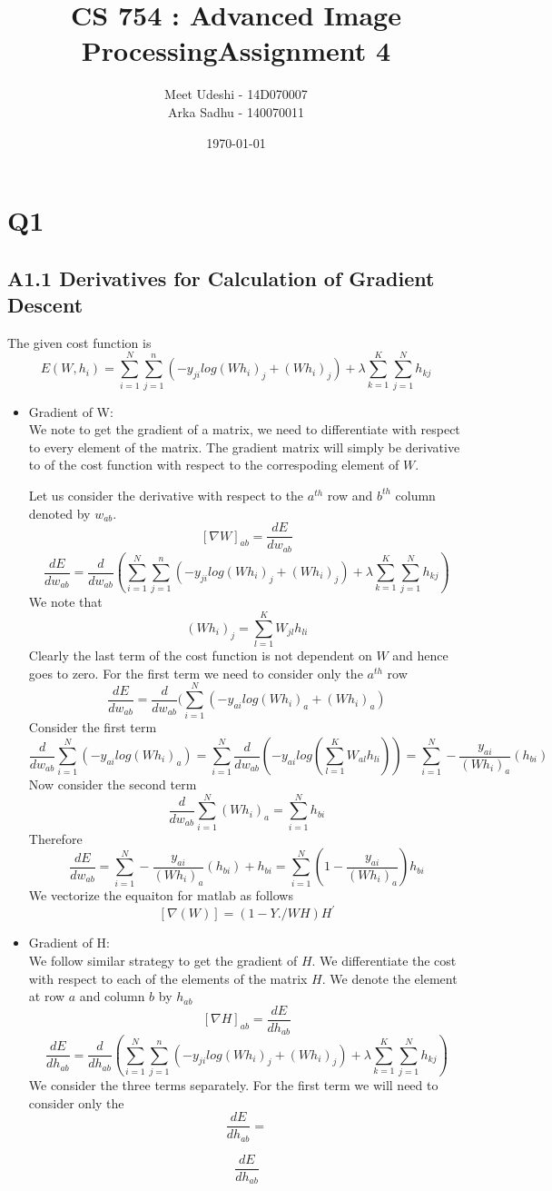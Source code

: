 \documentclass{article}
\title{CS 754 : Advanced Image ProcessingAssignment 4}
\author{Meet Udeshi - 14D070007\\
  Arka Sadhu - 140070011\\
}
\date{\today}
\begin{document}
\maketitle
\section*{Q1}
\subsection*{A1.1 Derivatives for Calculation of Gradient Descent}
The given cost function is
\begin{equation}
  \label{eq:1}
  E(W,{h_i}) = \sum_{i=1}^N\sum_{j=1}^n(-y_{ji}log(Wh_i)_j + (Wh_i)_j) + \lambda\sum_{k=1}^K\sum_{j=1}^Nh_{kj}
\end{equation}

\begin{itemize}
\item Gradient of W:\\
  We note to get the gradient of a matrix, we need to differentiate with respect to every element of the matrix. The gradient matrix will simply be derivative to of the cost function with respect to the correspoding element of $W$.

  Let us consider the derivative with respect to the $a^{th}$ row and $b^{th}$ column denoted by $w_{ab}$.
  $$[\nabla W]_{ab} = \frac{dE}{dw_{ab}}$$
  $$\frac{dE}{dw_{ab}} = \frac{d}{dw_{ab}}(\sum_{i=1}^N\sum_{j=1}^n(-y_{ji}log(Wh_i)_j + (Wh_i)_j) + \lambda\sum_{k=1}^K\sum_{j=1}^Nh_{kj})$$
  We note that
  $$(Wh_i)_j = \sum_{l=1}^KW_{jl}h_{li}$$
  Clearly the last term of the cost function is not dependent on $W$ and hence goes to zero. For the first term we need to consider only the $a^{th}$ row
  $$\frac{dE}{dw_{ab}} = \frac{d}{dw_{ab}}(\sum_{i=1}^N(-y_{ai}log(Wh_i)_a + (Wh_i)_a)$$
  Consider the first term
  $$\frac{d}{dw_{ab}}\sum_{i=1}^N(-y_{ai}log(Wh_i)_a) = \sum_{i=1}^N \frac{d}{dw_{ab}}(-y_{ai}log(\sum_{l=1}^KW_{al}h_{li})) =
  \sum_{i=1}^N -\frac{y_{ai}}{(Wh_i)_a}(h_{bi})$$
  Now consider the second term
  $$\frac{d}{dw_{ab}}\sum_{i=1}^N(Wh_i)_a = \sum_{i=1}^N h_{bi}$$
  Therefore
  $$\frac{dE}{dw_{ab}} = \sum_{i=1}^N -\frac{y_{ai}}{(Wh_i)_a}(h_{bi}) + h_{bi} = \sum_{i=1}^N(1-\frac{y_{ai}}{(Wh_i)_a})h_{bi}$$
  We vectorize the equaiton for matlab as follows
  $$[\nabla(W)] = (1 -Y./WH)H^{'}$$

\item Gradient of H:\\
  We follow similar strategy to get the gradient of $H$. We differentiate the cost with respect to each of the elements of the matrix $H$. We denote the element at row $a$ and column $b$ by $h_{ab}$
  $$[\nabla H]_{ab} = \frac{dE}{dh_{ab}}$$
  $$\frac{dE}{dh_{ab}} = \frac{d}{dh_{ab}}(\sum_{i=1}^N\sum_{j=1}^n(-y_{ji}log(Wh_i)_j + (Wh_i)_j) + \lambda\sum_{k=1}^K\sum_{j=1}^Nh_{kj})$$
  We consider the three terms separately. For the first term we will need to consider only the 
  $$\frac{dE}{dh_{ab}} = $$
  
  $$\frac{dE}{dh_{ab}}$$
  
\end{itemize}
\end{document}
